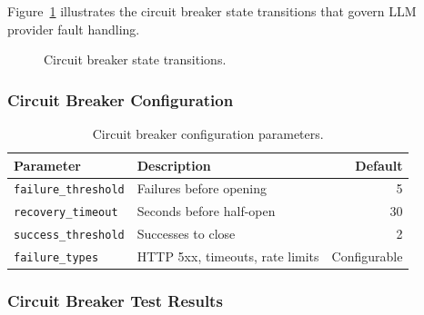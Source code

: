 Figure~\ref{fig:circuit-breaker-states} illustrates the circuit breaker state transitions that govern LLM provider fault handling.

\begin{figure}[ht]
\centering
{}
\caption{Circuit breaker state transitions.}
\label{fig:circuit-breaker-states}
\end{figure}

\subsubsection{Circuit Breaker Configuration}

\begin{table}[ht]
\centering
\caption{Circuit breaker configuration parameters.}
\label{tab:circuit-breaker-config}
\small
\begin{tabular}{llr}
\hline
\textbf{Parameter} & \textbf{Description} & \textbf{Default} \\
\hline
\texttt{failure\_threshold} & Failures before opening & 5 \\
\texttt{recovery\_timeout} & Seconds before half-open & 30 \\
\texttt{success\_threshold} & Successes to close & 2 \\
\texttt{failure\_types} & HTTP 5xx, timeouts, rate limits & Configurable \\
\hline
\end{tabular}
\end{table}

\subsubsection{Circuit Breaker Test Results}

